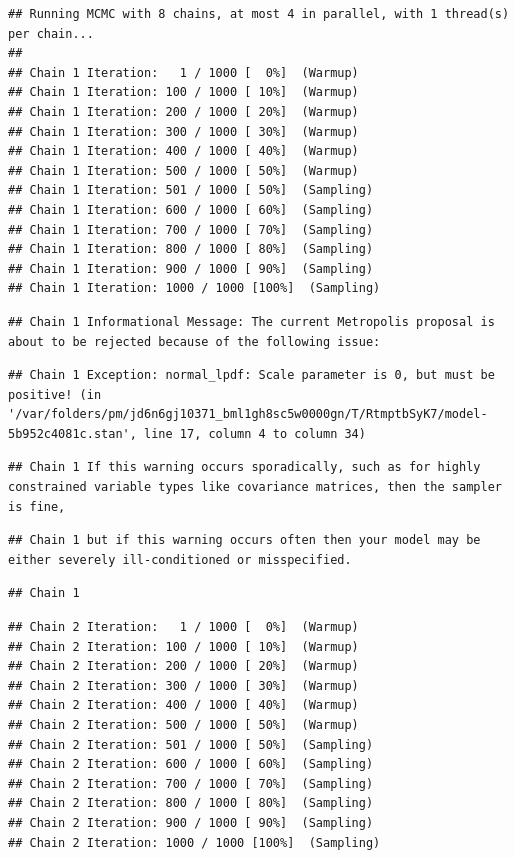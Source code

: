 \documentclass[
]{book}
\begin{document}
\begin{verbatim}
## Running MCMC with 8 chains, at most 4 in parallel, with 1 thread(s) per chain...
## 
## Chain 1 Iteration:   1 / 1000 [  0%]  (Warmup) 
## Chain 1 Iteration: 100 / 1000 [ 10%]  (Warmup) 
## Chain 1 Iteration: 200 / 1000 [ 20%]  (Warmup) 
## Chain 1 Iteration: 300 / 1000 [ 30%]  (Warmup) 
## Chain 1 Iteration: 400 / 1000 [ 40%]  (Warmup) 
## Chain 1 Iteration: 500 / 1000 [ 50%]  (Warmup) 
## Chain 1 Iteration: 501 / 1000 [ 50%]  (Sampling) 
## Chain 1 Iteration: 600 / 1000 [ 60%]  (Sampling) 
## Chain 1 Iteration: 700 / 1000 [ 70%]  (Sampling) 
## Chain 1 Iteration: 800 / 1000 [ 80%]  (Sampling) 
## Chain 1 Iteration: 900 / 1000 [ 90%]  (Sampling) 
## Chain 1 Iteration: 1000 / 1000 [100%]  (Sampling)
\end{verbatim}

\begin{verbatim}
## Chain 1 Informational Message: The current Metropolis proposal is about to be rejected because of the following issue:
\end{verbatim}

\begin{verbatim}
## Chain 1 Exception: normal_lpdf: Scale parameter is 0, but must be positive! (in '/var/folders/pm/jd6n6gj10371_bml1gh8sc5w0000gn/T/RtmptbSyK7/model-5b952c4081c.stan', line 17, column 4 to column 34)
\end{verbatim}

\begin{verbatim}
## Chain 1 If this warning occurs sporadically, such as for highly constrained variable types like covariance matrices, then the sampler is fine,
\end{verbatim}

\begin{verbatim}
## Chain 1 but if this warning occurs often then your model may be either severely ill-conditioned or misspecified.
\end{verbatim}

\begin{verbatim}
## Chain 1
\end{verbatim}

\begin{verbatim}
## Chain 2 Iteration:   1 / 1000 [  0%]  (Warmup) 
## Chain 2 Iteration: 100 / 1000 [ 10%]  (Warmup) 
## Chain 2 Iteration: 200 / 1000 [ 20%]  (Warmup) 
## Chain 2 Iteration: 300 / 1000 [ 30%]  (Warmup) 
## Chain 2 Iteration: 400 / 1000 [ 40%]  (Warmup) 
## Chain 2 Iteration: 500 / 1000 [ 50%]  (Warmup) 
## Chain 2 Iteration: 501 / 1000 [ 50%]  (Sampling) 
## Chain 2 Iteration: 600 / 1000 [ 60%]  (Sampling) 
## Chain 2 Iteration: 700 / 1000 [ 70%]  (Sampling) 
## Chain 2 Iteration: 800 / 1000 [ 80%]  (Sampling) 
## Chain 2 Iteration: 900 / 1000 [ 90%]  (Sampling) 
## Chain 2 Iteration: 1000 / 1000 [100%]  (Sampling)
\end{verbatim}
\end{document}

